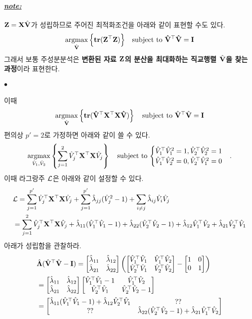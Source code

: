 \documentclass[12pt,oneside,english,a4paper]{article}
\def\ck{\paragraph{\Large$\bullet$}\Large}
\def\note{\paragraph{\Large\textit{\underline{note:}}}\Large}
\newcommand{\bs}[1]{\mbox{\boldmath $#1$}}
\newcommand{\bfI}{\mbox{$\bf{I}$}}
\newcommand{\bfV}{\mbox{$\bf{V}$}}
\newcommand{\bfX}{\mbox{$\bf{X}$}}
\newcommand{\bfZ}{\mbox{$\bf{Z}$}}
\DeclareMathOperator*{\argmax}{argmax}
\begin{document}
\note $\bfZ=\bfX\hat{\bfV}$가 성립하므로 주어진 최적화조건을 아래와 같이 표현할 수도 있다. 
\[
\argmax_{\hat{\bf V}}\Big\{\bf tr(Z^\top Z)\Big\} \quad \mbox{subject to } \hat{\bf V}^\top \hat{\bf V}=\bfI
\]
그래서 보통 주성분분석은 \textbf{변환된 자료 $\bfZ$의 분산을 최대화하는 직교행렬 $\hat{\bf V}$을 찾는 과정}이라 표현한다.

\ck 이때 
\[
\argmax_{\hat{\bf V}}\left\{\bf tr(\hat{V}^\top X^\top X \hat{V})\right\} \quad \mbox{subject to } \hat{\bf V}^\top \hat{\bf V}=\bfI
\]
편의상 $p'=2$로 가정하면 아래와 같이 쓸 수 있다. 
\[
\argmax_{\hat{V}_1,\hat{V}_2}\left\{\sum_{j=1}^{2}\hat{V}_j^\top\bfX^\top\bfX\hat{V}_j\right\} \quad \mbox{subject to $
\begin{cases}
\hat{V}_1^\top \hat{V}_1^2=1, \hat{V}_2^\top \hat{V}_2^2=1 \\ 
\hat{V}_1^\top \hat{V}_2^2=0, \hat{V}_2^\top \hat{V}_1^2=0
\end{cases}$.} 
\]
이때 라그랑주 $\cal L$은 아래와 같이 설정할 수 있다. 
\begin{align*}
&{\cal L}=\sum_{j=1}^{p'}\hat{V}_j^\top\bfX^\top\bfX\hat{V}_j+\sum_{j=1}^{p'}\hat{\lambda}_{jj}(\hat{V}_j^2-1)+\sum_{i\neq j }\hat{\lambda}_{ij}\hat{V}_i\hat{V}_j\\
&=\sum_{j=1}^{2}\hat{V}_j^\top\bfX^\top\bfX\hat{V}_j+\hat{\lambda}_{11}(\hat{V}_1^\top \hat{V}_1-1)+\hat{\lambda}_{22}(\hat{V}_2^\top \hat{V}_2-1)+\hat{\lambda}_{12}\hat{V}_1^\top \hat{V}_2+\hat{\lambda}_{21}\hat{V}_2^\top \hat{V}_1
\end{align*}
아래가 성립함을 관찰하라. 
\begin{align*}
&\hat{\bs{\Lambda}}(\hat{\bf V}^\top \hat{\bf V}-\bfI)=
\begin{bmatrix}
\hat\lambda_{11} & \hat\lambda_{12} \\
\hat\lambda_{21} & \hat\lambda_{22} 
\end{bmatrix}
\left(
\begin{bmatrix}
\hat{V}_1^\top\hat{V}_1 & \hat{V}_1^\top\hat{V}_2  \\
\hat{V}_2^\top\hat{V}_1  & \hat{V}_2^\top\hat{V}_2
\end{bmatrix}
-\begin{bmatrix}
1 & 0 \\
0 & 1
\end{bmatrix}
\right)\\
&=\begin{bmatrix}
\hat\lambda_{11} & \hat\lambda_{12} \\
\hat\lambda_{21} & \hat\lambda_{22} 
\end{bmatrix}
\begin{bmatrix}
\hat{V}_1^\top\hat{V}_1-1 & \hat{V}_1^\top\hat{V}_2  \\
\hat{V}_2^\top\hat{V}_1  & \hat{V}_2^\top\hat{V}_2-1
\end{bmatrix}\\
&=\begin{bmatrix}
\hat\lambda_{11}(\hat{V}_1^\top\hat{V}_1-1) +\hat\lambda_{12} \hat{V}_2^\top\hat{V}_1 & ??  \\
??  & \hat\lambda_{22}(\hat{V}_2^\top\hat{V}_2-1) +\hat\lambda_{21} \hat{V}_1^\top\hat{V}_2
\end{bmatrix}
\end{align*}
\end{document}
